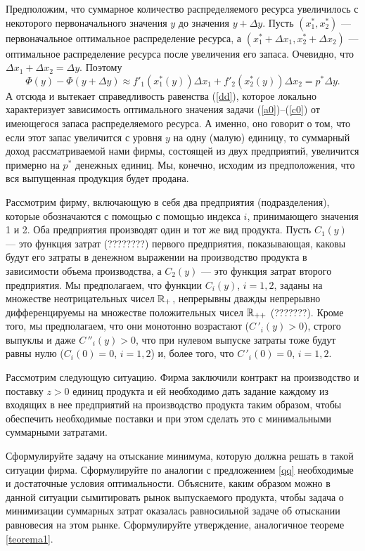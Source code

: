 Предположим, что суммарное количество распределяемого ресурса
увеличилось с некоторого первоначального значения $y$ до значения
$y+\Delta y$. Пусть $(x_{1}^{*},x_{2}^{*})$ --- первоначальное
оптимальное распределение ресурса, а $(x_{1}^{*}+\Delta
x_{1},x_{2}^{*}+\Delta x_{2})$ --- оптимальное распределение ресурса
после увеличения его запаса. Очевидно, что $\Delta x_{1}+\Delta
x_{2}=\Delta y$. Поэтому
\[\Phi(y)-\Phi(y+\Delta y)\approx
f'_{1}(x_{1}^{*}(y))\Delta x_{1} +f'_{2}(x_{2}^{*}(y))\Delta x_{2}=
p^{*}\Delta y.\]
 А отсюда и вытекает справедливость
равенства (\ref{dd}), которое локально характеризует зависимость
оптимального значения задачи (\ref{a0})--(\ref{c0}) от имеющегося
запаса распределяемого ресурса. А именно, оно говорит о том, что
если этот запас увеличится с уровня $y$ на одну (малую) единицу, то
суммарный доход рассматриваемой нами фирмы, состоящей из двух
предприятий, увеличится примерно на $p^{*}$ денежных единиц. Мы,
конечно, исходим из предположения, что вся выпущенная продукция
будет продана.

\begin{exer}
    \label{fun-zatrat}

Рассмотрим фирму, включающую в себя два предприятия (подразделения),
которые обозначаются с помощью с помощью индекса $i$, принимающего
значения 1 и 2. Оба предприятия производят один и тот же вид
продукта. Пусть $C_{1}(y)$ --- это функция затрат (????????) первого
предприятия, показывающая, каковы будут его затраты в денежном
выражении на производство продукта в зависимости объема
производства, а $C_{2}(y)$ --- это функция затрат второго
предприятия. Мы предполагаем, что функции $C_{i}(y)$, $i=1,2$,
заданы на множестве неотрицательных чисел $\mathbb{R}_{+}$, непрерывны
дважды непрерывно дифференцируемы на множестве положительных чисел
$\mathbb{R}_{++}$ (???????). Кроме того, мы предполагаем, что они монотонно
возрастают ($C\,'_{i}(y)>0$), строго выпуклы и даже
$C\,''_{i}(y)>0$, что при нулевом выпуске затраты тоже будут равны
нулю ($C_{i}(0)=0$, $i=1,2$) и, более того, что $C\,'_{i}(0)=0$,
$i=1,2$.


    Рассмотрим следующую ситуацию. Фирма заключили контракт на производство и поставку
    $z>0$ единиц продукта и ей необходимо дать задание каждому из входящих в нее
    предприятий на производство продукта таким образом, чтобы
    обеспечить необходимые поставки и при этом сделать это с
    минимальными суммарными затратами.

    Сформулируйте задачу на отыскание минимума, которую должна решать
    в такой ситуации фирма. Сформулируйте по аналогии с предложением
    \ref{qq} необходимые и достаточные условия оптимальности.
    Объясните, каким образом можно в данной ситуации сымитировать рынок
    выпускаемого продукта, чтобы задача о минимизации суммарных затрат
    оказалась равносильной задаче об отыскании равновесия на этом
    рынке. Сформулируйте утверждение, аналогичное теореме
    \ref{teorema1}.

\end{exer}

